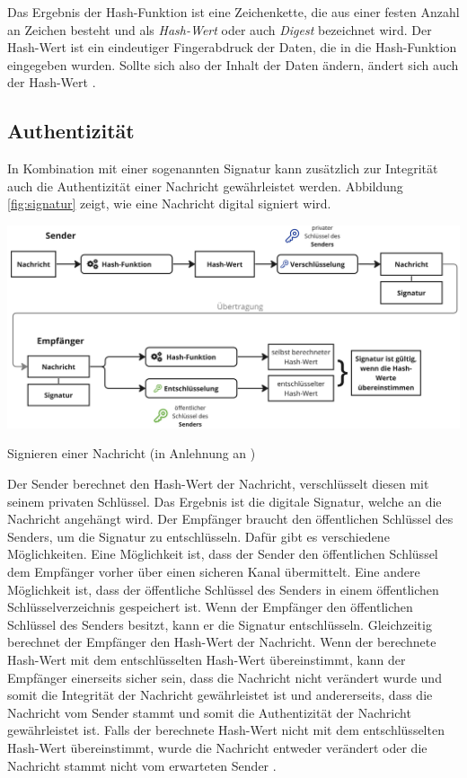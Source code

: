 Das Ergebnis der Hash-Funktion ist eine Zeichenkette, die aus einer festen Anzahl an Zeichen besteht und als \textit{Hash-Wert} oder auch \textit{Digest} bezeichnet wird. Der Hash-Wert ist ein eindeutiger Fingerabdruck der Daten, die in die Hash-Funktion eingegeben wurden. Sollte sich also der Inhalt der Daten ändern, ändert sich auch der Hash-Wert \parencite[S. 29-32]{Wong_KryptoPraxis}. 


\subsection{Authentizität}

In Kombination mit einer sogenannten Signatur kann zusätzlich zur Integrität auch die Authentizität einer Nachricht gewährleistet werden. Abbildung \ref{fig:signatur} zeigt, wie eine Nachricht digital signiert wird.

\begin{center}
    \captionsetup{type=figure}
    \includegraphics[width=1\linewidth]{images/signatur_2.jpg}
    \caption{Signieren einer Nachricht (in Anlehnung an \cite{DocuSign_digitaleSignaturen})}
    \label{fig:signatur}
\end{center}


\noindent Der Sender berechnet den Hash-Wert der Nachricht, verschlüsselt diesen mit seinem privaten Schlüssel. Das Ergebnis ist die digitale Signatur, welche an die Nachricht angehängt wird. Der Empfänger braucht den öffentlichen Schlüssel des Senders, um die Signatur zu entschlüsseln. Dafür gibt es verschiedene Möglichkeiten. Eine Möglichkeit ist, dass der Sender den öffentlichen Schlüssel dem Empfänger vorher über einen sicheren Kanal übermittelt. Eine andere Möglichkeit ist, dass der öffentliche Schlüssel des Senders in einem öffentlichen Schlüsselverzeichnis gespeichert ist. Wenn der Empfänger den öffentlichen Schlüssel des Senders besitzt, kann er die Signatur entschlüsseln. Gleichzeitig berechnet der Empfänger den Hash-Wert der Nachricht. Wenn der berechnete Hash-Wert mit dem entschlüsselten Hash-Wert übereinstimmt, kann der Empfänger einerseits sicher sein, dass die Nachricht nicht verändert wurde und somit die Integrität der Nachricht gewährleistet ist und andererseits, dass die Nachricht vom Sender stammt und somit die Authentizität der Nachricht gewährleistet ist. Falls der berechnete Hash-Wert nicht mit dem entschlüsselten Hash-Wert übereinstimmt, wurde die Nachricht entweder verändert oder die Nachricht stammt nicht vom erwarteten Sender \Parencite[S. 73-78]{Hellmann_IT-Sicherheit}.


